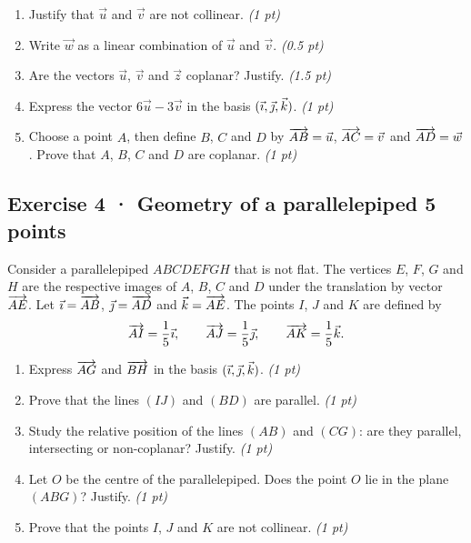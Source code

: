 \begin{enumerate}

\item Justify that $\vec u$ and $\vec v$ are not collinear. \hfill\textit{(1 pt)}

\item Write $\vec w$ as a linear combination of $\vec u$ and $\vec v$. \hfill\textit{(0.5 pt)}

\item Are the vectors $\vec u$, $\vec v$ and $\vec z$ coplanar? Justify. \hfill\textit{(1.5 pt)}

\item Express the vector $6\vec u-3\vec v$ in the basis $(\vec{\imath},\vec{\jmath},\vec k)$. \hfill\textit{(1 pt)}

\item Choose a point $A$, then define $B$, $C$ and $D$ by $\overrightarrow{AB}=\vec u$, $\overrightarrow{AC}=\vec v$ and $\overrightarrow{AD}=\vec w$. Prove that $A$, $B$, $C$ and $D$ are coplanar. \hfill\textit{(1 pt)}

\end{enumerate}

\subsection*{Exercise 4 · Geometry of a parallelepiped \hfill 5 points}Consider a parallelepiped $ABCDEFGH$ that is not flat. The vertices $E$, $F$, $G$ and $H$ are the respective images of $A$, $B$, $C$ and $D$ under the translation by vector $\overrightarrow{AE}$.
Let $\vec{\imath}=\overrightarrow{AB}$, $\vec{\jmath}=\overrightarrow{AD}$ and $\vec k=\overrightarrow{AE}$.
The points $I$, $J$ and $K$ are defined by
\[\overrightarrow{AI}=\frac1{5}\vec{\imath},\qquad\overrightarrow{AJ}=\frac1{5}\vec{\jmath},\qquad\overrightarrow{AK}=\frac1{5}\vec k.\]

\begin{enumerate}

\item Express $\overrightarrow{AG}$ and $\overrightarrow{BH}$ in the basis $(\vec{\imath},\vec{\jmath},\vec k)$. \hfill\textit{(1 pt)}

\item Prove that the lines $(IJ)$ and $(BD)$ are parallel. \hfill\textit{(1 pt)}

\item Study the relative position of the lines $(AB)$ and $(CG)$: are they parallel, intersecting or non-coplanar? Justify. \hfill\textit{(1 pt)}

\item Let $O$ be the centre of the parallelepiped. Does the point $O$ lie in the plane $(ABG)$? Justify. \hfill\textit{(1 pt)}

\item Prove that the points $I$, $J$ and $K$ are not collinear. \hfill\textit{(1 pt)}

\end{enumerate}

